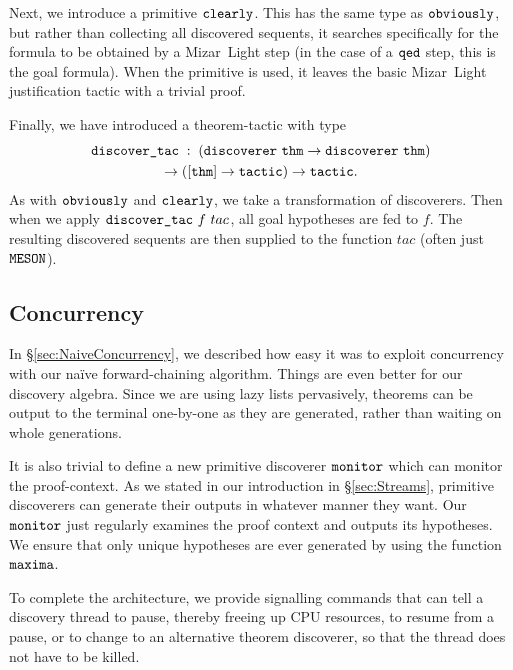 Next, we introduce a primitive $\texttt{clearly}$. This has the same type as $\texttt{obviously}$, but rather than collecting all discovered sequents, it searches specifically for the formula to be obtained by a Mizar~Light step (in the case of a $\texttt{qed}$ step, this is the goal formula). When the  primitive is used, it leaves the basic Mizar~Light justification tactic with a trivial proof.

\label{sec:DiscoverTac}
Finally, we have introduced a theorem-tactic  with type
\begin{multline*}
\code{discover\_tac}\;:\;(\code{discoverer}\ \code{thm}\rightarrow\code{discoverer} \ \code{thm}) \\\rightarrow ([\code{thm}] \rightarrow \code{tactic}) \rightarrow \code{tactic}.
\end{multline*}
As with $\texttt{obviously}$ and $\texttt{clearly}$, we take a transformation of discoverers. Then when we apply $\texttt{discover\_tac}\ f\ tac$,  all goal hypotheses are fed to $f$. The resulting discovered sequents are then supplied to the function $tac$ (often just $\texttt{MESON}$).

\subsection{Concurrency}
In \S\ref{sec:NaiveConcurrency}, we described how easy it was to exploit concurrency with our na\"{i}ve forward-chaining algorithm. Things are even better for our discovery algebra. Since we are using lazy lists pervasively, theorems can be output to the terminal one-by-one as they are generated, rather than waiting on whole generations.

It is also trivial to define a new primitive discoverer $\texttt{monitor}$ which can monitor the proof-context. As we stated in our introduction in \S\ref{sec:Streams}, primitive discoverers can generate their outputs in whatever manner they want. Our $\texttt{monitor}$ just regularly examines the proof context and outputs its hypotheses. We ensure that only unique hypotheses are ever generated by using the function $\texttt{maxima}$.

To complete the architecture, we provide signalling commands that can tell a discovery thread to pause, thereby freeing up CPU resources, to resume from a pause, or to change to an alternative theorem discoverer, so that the thread does not have to be killed.


